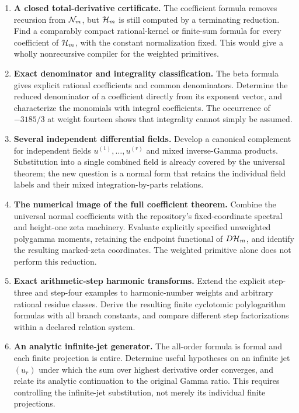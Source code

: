 \documentclass[11pt,letterpaper]{article}
\numberwithin{equation}{section}
\theoremstyle{plain}
\theoremstyle{definition}
\theoremstyle{remark}
\begin{document}
\begin{enumerate}[leftmargin=*,itemsep=7pt]
\item \textbf{A closed total-derivative certificate.}
The coefficient formula removes recursion from $\mathcal N_m$, but $\mathcal H_m$ is still computed by a terminating reduction. Find a comparably compact rational-kernel or finite-sum formula for every coefficient of $\mathcal H_m$, with the constant normalization fixed. This would give a wholly nonrecursive compiler for the weighted primitives.

\item \textbf{Exact denominator and integrality classification.}
The beta formula gives explicit rational coefficients and common denominators. Determine the reduced denominator of a coefficient directly from its exponent vector, and characterize the monomials with integral coefficients. The occurrence of $-3185/3$ at weight fourteen shows that integrality cannot simply be assumed.

\item \textbf{Several independent differential fields.}
Develop a canonical complement for independent fields $u^{(1)},\ldots,u^{(r)}$ and mixed inverse-Gamma products. Substitution into a single combined field is already covered by the universal theorem; the new question is a normal form that retains the individual field labels and their mixed integration-by-parts relations.

\item \textbf{The numerical image of the full coefficient theorem.}
Combine the universal normal coefficients with the repository's fixed-coordinate spectral and height-one zeta machinery. Evaluate explicitly specified unweighted polygamma moments, retaining the endpoint functional of $D\mathcal H_m$, and identify the resulting marked-zeta coordinates. The weighted primitive alone does not perform this reduction.

\item \textbf{Exact arithmetic-step harmonic transforms.}
Extend the explicit step-three and step-four examples to harmonic-number weights and arbitrary rational residue classes. Derive the resulting finite cyclotomic polylogarithm formulas with all branch constants, and compare different step factorizations within a declared relation system.

\item \textbf{An analytic infinite-jet generator.}
The all-order formula is formal and each finite projection is entire. Determine useful hypotheses on an infinite jet $(u_r)$ under which the sum over highest derivative order converges, and relate its analytic continuation to the original Gamma ratio. This requires controlling the infinite-jet substitution, not merely its individual finite projections.


\end{enumerate}
\end{document}
